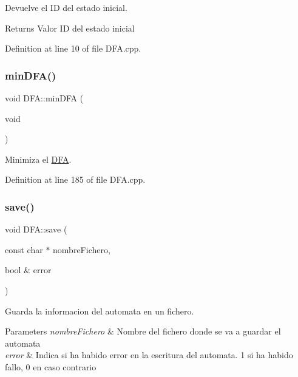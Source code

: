 Devuelve el ID del estado inicial. 

\begin{DoxyReturn}{Returns}
Valor ID del estado inicial 
\end{DoxyReturn}


Definition at line 10 of file D\+F\+A.\+cpp.

\mbox{\label{class_d_f_a_ab17185eaa4d96f9822bab514372abdd9}} 
\subsubsection{\texorpdfstring{min\+D\+F\+A()}{minDFA()}}
{\footnotesize\ttfamily void D\+F\+A\+::min\+D\+FA (\begin{DoxyParamCaption}\item[{void}]{ }\end{DoxyParamCaption})}



Minimiza el \hyperlink{class_d_f_a}{D\+FA}. 



Definition at line 185 of file D\+F\+A.\+cpp.

\mbox{\label{class_d_f_a_ac614efadfde86fde0b0ab45f2c9c2e5e}} 
\subsubsection{\texorpdfstring{save()}{save()}}
{\footnotesize\ttfamily void D\+F\+A\+::save (\begin{DoxyParamCaption}\item[{const char $\ast$}]{nombre\+Fichero,  }\item[{bool \&}]{error }\end{DoxyParamCaption})}



Guarda la informacion del automata en un fichero. 


\begin{DoxyParams}{Parameters}
{\em nombre\+Fichero} & Nombre del fichero donde se va a guardar el automata \\
\hline
{\em error} & Indica si ha habido error en la escritura del automata. 1 si ha habido fallo, 0 en caso contrario \\
\hline
\end{DoxyParams}


